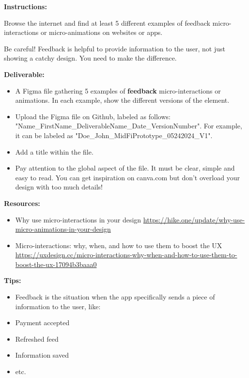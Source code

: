 \makeheaderfiles

\textbf{Instructions:}

Browse the internet and find at least 5 different examples of feedback micro-interactions or micro-animations on websites or apps.

Be careful! Feedback is helpful to provide information to the user, not just showing a catchy design. You need to make the difference.

\textbf{Deliverable:}

\begin{itemize}
\item A Figma file gathering 5 examples of \textbf{feedback} micro-interactions or animations. In each example, show the different versions of the element.
\item Upload the Figma file on Github, labeled as follows: "Name\_FirstName\_DeliverableName\_Date\_VersionNumber". For example, it can be labeled as "Doe\_John\_MidFiPrototype\_05242024\_V1".
\item Add a title within the file.
\item Pay attention to the global aspect of the file. It must be clear, simple and easy to read. You can get inspiration on canva.com but don't overload your design with too much details!
\end{itemize}

\textbf{Resources:}

\begin{itemize}
\item Why use micro-interactions in your design \url{https://hike.one/update/why-use-micro-animations-in-your-design}
\item Micro-interactions: why, when,  and how to use them to boost the UX \url{https://uxdesign.cc/micro-interactions-why-when-and-how-to-use-them-to-boost-the-ux-17094b3baaa0}
\end{itemize}

\textbf{Tips:}

\begin{itemize}
\item Feedback is the situation when the app specifically sends a piece of information to the user, like: 
\item Payment accepted
\item Refreshed feed
\item Information saved
\item etc.
\end{itemize}

